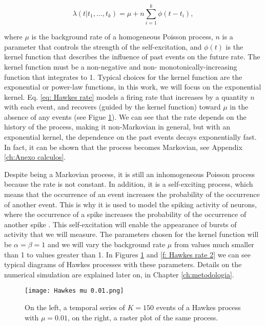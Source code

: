 \begin{equation}
    \lambda(t|t_1, \ldots, t_k) = \mu + n\sum_{i=1}^k \phi (t-t_i),
    \label{eq: Hawkes rate}
\end{equation}

where $\mu$ is the background rate of a homogeneous Poisson process, $n$ is a parameter that controls the strength of the self-excitation, and $\phi(t)$ is the kernel function that
describes the influence of past events on the future rate. The kernel function must be a non-negative and non- monotonically-increasing function that integrates to 1.
Typical choices for the kernel function are the exponential or power-law functions, in this work, we will focus on the exponential kernel. 
Eq. \ref{eq: Hawkes rate} models a firing rate that increases by a quantity $n$ with each event, and recovers (guided by the kernel function) toward $\mu$ in the absence of any events 
(see Figue \ref{f: Hawkes rate}).
We can see that the rate depends on the history of the process, making it non-Markovian in general, but with an exponential kernel, the dependence on the 
past events decays exponentially fast. In fact, it can be shown that the process becomes Markovian, see Appendix \ref{ch:Anexo calculos}.

Despite being a Markovian process, it is still an inhomogeneous Poisson process because the rate is not constant. In addition, it is a self-exciting process, which means that the occurrence
of an event increases the probability of the occurrence of another event. This is why it is used to model the spiking activity of neurons, where the occurrence of a spike increases the
probability of the occurrence of another spike \cite{munoz2018colloquium}. 
This self-excitation will enable the appearance of bursts of activity that we will measure. The parameters chosen for the kernel function 
will be $\alpha=\beta=1$ and we will vary the background rate $\mu$ from values much smaller than 1 to values greater than 1. In Figures \ref{f: Hawkes rate} and \ref{f: Hawkes rate 2}
we can see typical diagrams of Hawkes processes with these parameters. Details on the numerical simulation are explained later on, in Chapter \ref{ch:metodologia}.

\begin{figure}[H]
    \centering
    \texttt{[image: Hawkes mu 0.01.png]}
    \caption{On the left, a temporal series of $K=150$ events of a Hawkes process with $\mu=0.01$, on the right, a raster plot of the same process.}
    \label{f: Hawkes rate}
\end{figure}

